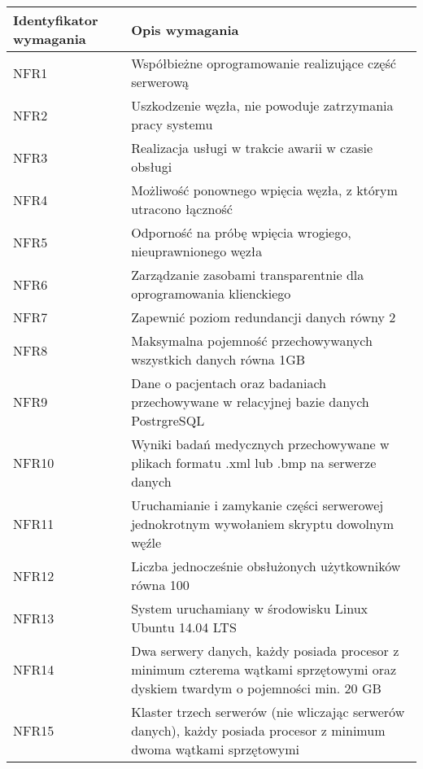   \begin{longtable}{| p{} || p{} |} 
\hline
\textbf{Identyfikator wymagania} & \textbf{Opis wymagania} \\ \hline
NFR1 & Współbieżne oprogramowanie realizujące część serwerową \\ \hline
NFR2 & Uszkodzenie węzła, nie powoduje zatrzymania pracy systemu
 \\ \hline
NFR3 & Realizacja usługi w trakcie awarii w czasie obsługi
 \\ \hline
NFR4 & Możliwość ponownego wpięcia węzła, z którym utracono łączność
 \\ \hline
NFR5 & Odporność na próbę wpięcia wrogiego, nieuprawnionego węzła
 \\ \hline
NFR6 & Zarządzanie zasobami transparentnie dla oprogramowania klienckiego
 \\ \hline
NFR7 & Zapewnić poziom redundancji danych równy 2
 \\ \hline
NFR8 & Maksymalna pojemność przechowywanych wszystkich danych równa 1GB
 \\ \hline
NFR9 & Dane o pacjentach oraz badaniach przechowywane w relacyjnej bazie danych PostrgreSQL
 \\ \hline
NFR10 & Wyniki badań medycznych przechowywane w plikach formatu .xml lub .bmp na serwerze danych
 \\ \hline
NFR11 & Uruchamianie i zamykanie części serwerowej jednokrotnym wywołaniem skryptu dowolnym węźle
 \\ \hline
NFR12 & Liczba jednocześnie obsłużonych użytkowników równa 100
 \\ \hline
NFR13 & System uruchamiany w środowisku Linux Ubuntu 14.04 LTS
 \\ \hline
NFR14 & Dwa serwery danych, każdy posiada procesor z minimum czterema wątkami sprzętowymi oraz dyskiem twardym o pojemności min. 20 GB
 \\ \hline
NFR15 & Klaster trzech serwerów (nie wliczając serwerów danych), każdy posiada     procesor z minimum dwoma wątkami sprzętowymi
 \\ \hline
  \end{longtable}  
